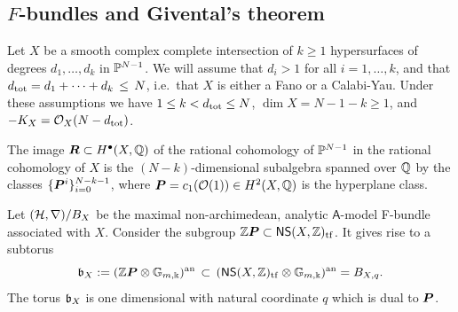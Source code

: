 \documentclass[twoside,leqno]{article}
\numberwithin{equation}{section}
\theoremstyle{plain}
\theoremstyle{definition}
\begin{document}
\subsection{\texorpdfstring{$F$}{F}-bundles and Givental's theorem} \label{ssec:givental}
 
Let $X$ be a smooth complex complete intersection of $k \geq 1$ hypersurfaces of degrees $d_{1}, \ldots, d_{k}$ in $\mathbb P^{N-1}$. We will assume that $d_{i} > 1$ for all $i =1, \ldots, k$, and that $d_{\operatorname{tot}} = d_{1} + \cdots + d_{k} \, \leq \, N$, i.e.\ that $X$ is either a Fano or a Calabi-Yau. Under these assumptions we have $1 \leq k < d_{\operatorname{tot}} \leq N$, 
$\dim X = N - 1 - k \geq 1$, and $-K_{X} = \mathcal O_{X}(N - d_{\operatorname{tot}})$. 

The image $\boldsymbol{R} \subset H^{\bullet}(X,\mathbb Q)$ of the rational cohomology of $\mathbb P^{N-1}$ in the rational cohomology of $X$ is the $(N-k)$-dimensional subalgebra spanned over $\mathbb Q$ by the classes $\{\boldsymbol{P}^{i} \}_{i = 0}^{N-k-1}$, where $\boldsymbol{P} = c_{1}(\mathcal O(1)) \in H^2(X,\mathbb Q)$ is the hyperplane class. 


Let $(\mathcal H,\nabla)/B_{X}$ be the maximal non-archimedean, analytic $\mathsf{A}$-model F-bundle associated with  $X$. Consider the subgroup $\mathbb Z\boldsymbol{P} \subset \mathsf{NS}(X,\mathbb Z)_{\operatorname{tf}}$. It gives rise to a subtorus 
\[
\mathfrak{b}_{X} := (\mathbb Z\boldsymbol{P} \otimes \mathbb G_{m,\Bbbk})^{\operatorname{an}} \, \subset \, (\mathsf{NS}(X,\mathbb Z)_{\operatorname{tf}}\otimes \mathbb G_{m,\Bbbk})^{\operatorname{an}} = B_{X,q}.
\]
The torus $\mathfrak{b}_{X}$ is one dimensional with natural coordinate $q$ which is dual to $\boldsymbol{P}$.
\end{document}
